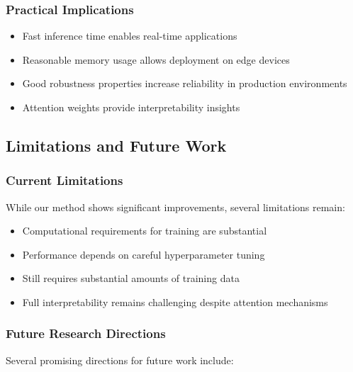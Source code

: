\subsubsection{Practical Implications}

\begin{itemize}
    \item Fast inference time enables real-time applications
    \item Reasonable memory usage allows deployment on edge devices
    \item Good robustness properties increase reliability in production environments
    \item Attention weights provide interpretability insights
\end{itemize}

\subsection{Limitations and Future Work}

\subsubsection{Current Limitations}

While our method shows significant improvements, several limitations remain:

\begin{itemize}
    \item Computational requirements for training are substantial
    \item Performance depends on careful hyperparameter tuning
    \item Still requires substantial amounts of training data
    \item Full interpretability remains challenging despite attention mechanisms
\end{itemize}

\subsubsection{Future Research Directions}

Several promising directions for future work include:


